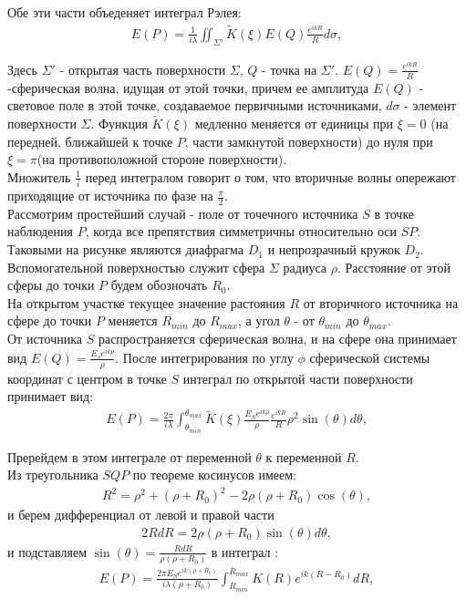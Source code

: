 \documentclass[__main__.tex]{subfiles}
\begin{document}
Обе эти части объеденяет интеграл Рэлея:
\begin{gather}
E(P)= \frac{1}{i\lambda}\iint_{\Sigma'} \tilde{K}(\xi)E(Q)\frac{e^{ikR}}{R}d\sigma ,
\end{gather}

Здесь $\Sigma'$ - открытая часть поверхности $\Sigma$, $Q$ - точка на $\Sigma'$. $E(Q)=\frac{e^{ikR}}{R}$ -сферическая волна, идущая от этой точки, причем ее амплитуда $E(Q)$ - световое поле в этой точке, создаваемое первичными источниками, $d\sigma$ - элемент поверхности $\Sigma$. Функция $\tilde{K}(\xi)$ медленно меняется от единицы при $\xi = 0$ (на передней, ближайшей к точке $P$, части замкнутой поверхности) до нуля при $\xi = \pi$(на противоположной стороне поверхности).\\

Множитель $\frac{1}{i} $ перед интегралом говорит о том, что вторичные волны опережают приходящие от источника по фазе на $\frac{\pi}{2}$.\\

Рассмотрим простейший случай - поле от точечного источника $S$ в точке наблюдения $P$, когда все препятствия симметричны относительно оси $SP$. Таковыми на рисунке являются диафрагма $D_1$ и непрозрачный кружок $D_2$. Вспомогательной поверхностью служит сфера $\Sigma$ радиуса $\rho$. Расстояние от этой сферы до точки $P$ будем обозночать $R_0$.\\

На открытом участке текущее значение растояния $R$ от вторичного источника на сфере до точки $P$ меняется $R_{min}$ до $R_{max}$, а угол $\theta$ - от $\theta_{min}$ до $\theta_{max}$.\\

От источника $S$ распространяется сферическая волна, и на сфере она принимает вид $E(Q)=\frac{E_s e^{ikp}}{\rho}$. После интегрирования по углу $\phi$ сферической системы координат с центром в точке $S$ интеграл по открытой части поверхности принимает вид:\\
\begin{gather}
E(P)=\frac{2\pi}{i\lambda} \int_{\theta_{min}}^{\theta_{max}} \tilde{K} (\xi) \frac{E_S e^{ik\rho}}{\rho} \frac{e^{ikR}}{R} \rho^2 \sin(\theta) d\theta ,
\end{gather}

Пререйдем в этом интеграле от переменной $\theta$ к переменной $R$.\\
Из треугольника $SQP$ по теореме косинусов имеем:
\begin{gather}
R^2 = \rho^2 + (\rho + R_0)^2 - 2\rho(\rho + R_0)\cos(\theta) ,
\end{gather}
и берем дифференциал от левой и правой части
\begin{gather}
2RdR = 2\rho(\rho + R_0)\sin(\theta)d\theta ,
\end{gather}
и подставляем $\sin (\theta) = \frac{RdR}{\rho(\rho + R_0)}$ в интеграл :
\begin{gather}
E(P) = \frac{2\pi E_S e^{ik(\rho + R_0)}}{i\lambda(\rho + R_0)} \int_{R_{min}}^{R_{max}} K(R)e^{ik(R-R_0)}dR ,
\end{gather}
\end{document}

